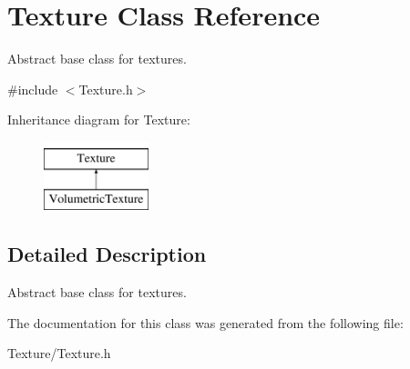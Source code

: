 \hypertarget{class_texture}{}\section{Texture Class Reference}
\label{class_texture}


Abstract base class for textures.  




{\ttfamily \#include $<$Texture.\+h$>$}

Inheritance diagram for Texture\+:\begin{figure}[H]
\begin{center}
\leavevmode
\includegraphics[height=2.000000cm]{class_texture}
\end{center}
\end{figure}


\subsection{Detailed Description}
Abstract base class for textures. 



The documentation for this class was generated from the following file\+:\begin{DoxyCompactItemize}
\item 
Texture/Texture.\+h\end{DoxyCompactItemize}
